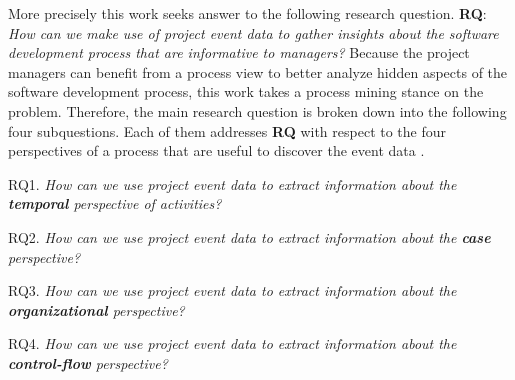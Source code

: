 More precisely this work seeks answer to the following research question. \textbf{RQ}: \emph{How can we make use of project event data to gather insights about the software development process that are informative to managers?} 
Because the project managers can benefit from a process view to better analyze hidden aspects of the software development process, this work takes a process mining stance on the problem. Therefore, the main research question is broken down into the following four subquestions. Each of them addresses \textbf{RQ} with respect to the four perspectives of a process that are useful to discover the event data \citep{DBLP:books/sp/Aalst16}.


\begin{inparadesc}
	\item[RQ1.] \emph{How can we use project event data to extract information about the \textbf{temporal} perspective of activities?} 
	
	\item[RQ2.] \emph{How can we use project event data to extract information about the \textbf{case} perspective?} 
	
	\item[RQ3.] \emph{How can we use project event data to extract information about the \textbf{organizational} perspective?} 
	
	\item[RQ4.] \emph{How can we use project event data to extract information about the \textbf{control-flow} perspective?} 
	
\end{inparadesc}


